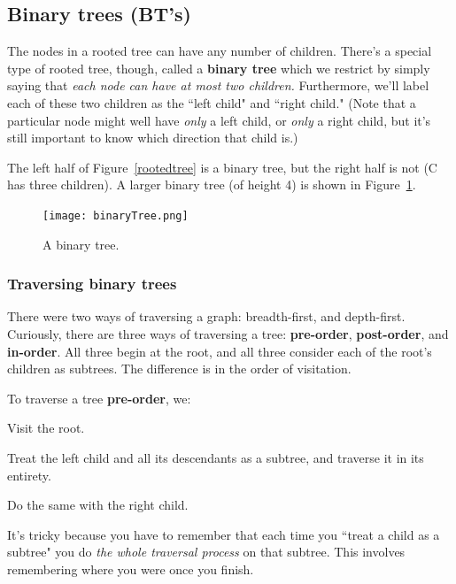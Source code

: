 \subsection{Binary trees (BT's)}

The nodes in a rooted tree can have any number of children. There's a
special type of rooted tree, though, called a \textbf{binary tree} which we
restrict by simply saying that \textit{each node can have at most two
children.} Furthermore, we'll label each of these two children as the
``left child" and ``right child." (Note that a particular node might well
have \textit{only} a left child, or \textit{only} a right child, but it's
still important to know which direction that child is.)

The left half of Figure~\ref{rootedtree} is a binary tree, but the right
half is not (C has three children). A larger binary tree (of height 4) is
shown in Figure~\ref{binarytree}.

\begin{figure}[ht]
\centering
\texttt{[image: binaryTree.png]}
\caption{A binary tree.}
\label{binarytree}
\end{figure}

\subsubsection{Traversing binary trees}

There were two ways of traversing a graph: breadth-first, and depth-first.
Curiously, there are three ways of traversing a tree: \textbf{pre-order},
\textbf{post-order}, and \textbf{in-order}. All three begin at the root,
and all three consider each of the root's children as subtrees. The
difference is in the order of visitation.


\begin{framed}
To traverse a tree \textbf{pre-order}, we:
\begin{compactenum}
\item Visit the root.
\item Treat the left child and all its descendants as a subtree, and
traverse it in its entirety.
\item Do the same with the right child.
\end{compactenum}
\end{framed}

It's tricky because you have to remember that each time you ``treat a child
as a subtree" you do \textit{the whole traversal process} on that subtree.
This involves remembering where you were once you finish.

